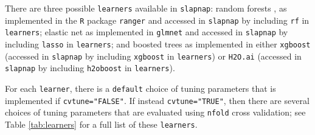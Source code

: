 \documentclass[]{article}
\begin{document}
There are three possible \texttt{learners} available in
\texttt{slapnap}: random forests \citep{breiman2001}, as implemented in
the \texttt{R} package \texttt{ranger} \citep{rangerpkg} and accessed in
\texttt{slapnap} by including
\texttt{\textquotesingle{}rf\textquotesingle{}} in \texttt{learners};
elastic net \citep{zou2005} as implemented in \texttt{glmnet}
\citep{glmnetpkg} and accessed in \texttt{slapnap} by including
\texttt{\textquotesingle{}lasso\textquotesingle{}} in \texttt{learners};
and boosted trees \citep{friedman2001, chen2016} as implemented in
either \texttt{xgboost} \citep{xgboostpkg} (accessed in \texttt{slapnap}
by including \texttt{\textquotesingle{}xgboost\textquotesingle{}} in
\texttt{learners}) or \texttt{H2O.ai} \citep{h2opkg} (accessed in
\texttt{slapnap} by including
\texttt{\textquotesingle{}h2oboost\textquotesingle{}} in
\texttt{learners}).

For each \texttt{learner}, there is a \texttt{default} choice of tuning
parameters that is implemented if \texttt{cvtune="FALSE"}. If instead
\texttt{cvtune="TRUE"}, then there are several choices of tuning
parameters that are evaluated using \texttt{nfold} cross validation; see
Table \ref{tab:learners} for a full list of these \texttt{learners}.
\end{document}
